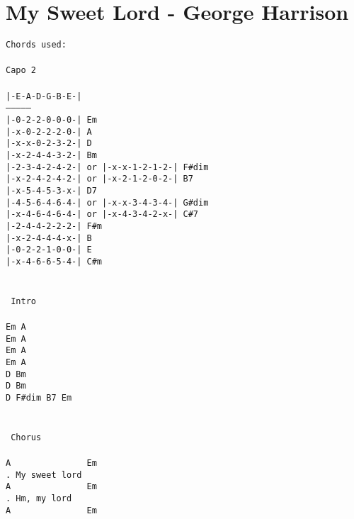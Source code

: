 \newpage
\section{My Sweet Lord - George Harrison}
\label{My Sweet Lord - George Harrison}
\texttt{Chords\ used:\\
\\
Capo\ 2\\
\\
|-E-A-D-G-B-E-|\\
---------------\\
|-0-2-2-0-0-0-|  Em\ \\
|-x-0-2-2-2-0-|  A\ \\
|-x-x-0-2-3-2-|  D\ \\
|-x-2-4-4-3-2-|  Bm\ \\
|-2-3-4-2-4-2-|\ or\ |-x-x-1-2-1-2-|  F\#dim\ \\
|-x-2-4-2-4-2-|\ or\ |-x-2-1-2-0-2-|  B7\ \\
|-x-5-4-5-3-x-|  D7\ \\
|-4-5-6-4-6-4-|\ or\ |-x-x-3-4-3-4-|  G\#dim\ \\
|-x-4-6-4-6-4-|\ or\ |-x-4-3-4-2-x-|  C\#7\ \\
|-2-4-4-2-2-2-|  F\#m\ \\
|-x-2-4-4-4-x-|  B\ \\
|-0-2-2-1-0-0-|  E\ \\
|-x-4-6-6-5-4-|  C\#m\ \\
\\
\\
\lbrack\ Intro\rbrack\\
\\
Em\ A\ \\
Em\ A\ \\
Em\ A\ \\
Em\ A\ \\
D\ Bm\ \\
D\ Bm\ \\
D\ F\#dim\ B7\ Em\\
\\
\\
\lbrack\ Chorus\rbrack\\
\\
A\ \ \ \ \ \ \ \ \ \ \ \ \ \ \ Em\ \ \ \ \ \ \ \ \ \\
.\ My\ sweet\ lord\\
A\ \ \ \ \ \ \ \ \ \ \ \ \ \ \ Em\\
.\ Hm,\ my\ lord\\
A\ \ \ \ \ \ \ \ \ \ \ \ \ \ \ Em\\
}
